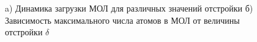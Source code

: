 \begin{figure}[ht]
    \centering
    \hspace{10 mm} 
    \caption{a) Динамика загрузки МОЛ для различных значений отстройки б)  Зависимость максимального числа атомов в МОЛ от величины отстройки $\delta$}
\end{figure}
